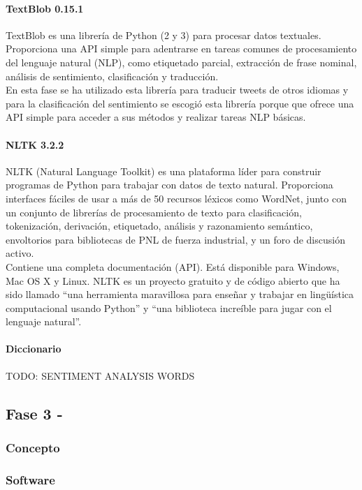 \documentclass[../all.tex]{subfiles}
\begin{document}
		\newpage
        \paragraph{TextBlob 0.15.1}
        	TextBlob es una librería de Python (2 y 3) para procesar datos textuales. Proporciona una API simple para adentrarse en tareas comunes de procesamiento del lenguaje natural (NLP), como etiquetado parcial, extracción de frase nominal, análisis de sentimiento, clasificación y traducción.\\
        	
        	En esta fase se ha utilizado esta librería para traducir tweets de otros idiomas y para la clasificación del sentimiento se escogió esta librería porque que ofrece una API simple para acceder a sus métodos y realizar tareas NLP básicas.
        	
        \paragraph{NLTK 3.2.2}
			NLTK (Natural Language Toolkit) es una plataforma líder para construir programas de Python para trabajar con datos de texto natural. Proporciona interfaces fáciles de usar a más de 50 recursos léxicos como WordNet, junto con un conjunto de librerías de procesamiento de texto para clasificación, tokenización, derivación, etiquetado, análisis y razonamiento semántico, envoltorios para bibliotecas de PNL de fuerza industrial, y un foro de discusión activo.\\
			
			Contiene una completa documentación (API). Está disponible para Windows, Mac OS X y Linux. NLTK es un proyecto gratuito y de código abierto que ha sido llamado ``una herramienta maravillosa para enseñar y trabajar en lingüística computacional usando Python'' y ``una biblioteca increíble para jugar con el lenguaje natural''.
		\newpage		
        \paragraph{Diccionario}
            {\color{red} 
            TODO: SENTIMENT ANALYSIS WORDS
            }
\newpage
\subsection{Fase 3 - }
    \subsubsection{Concepto}

    \subsubsection{Software}
\end{document}
